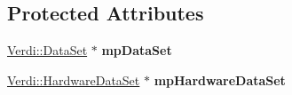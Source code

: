 \subsection*{\-Protected \-Attributes}
\begin{DoxyCompactItemize}
\item 
\hypertarget{class_data_set_variable_ac56dd5a4e81bebd16afad09d38a99009}{\hyperlink{class_verdi_1_1_data_set}{\-Verdi\-::\-Data\-Set} $\ast$ {\bfseries mp\-Data\-Set}}\label{class_data_set_variable_ac56dd5a4e81bebd16afad09d38a99009}

\item 
\hypertarget{class_data_set_variable_acfbb9e17f9547296cbf2cebd41813cb3}{\hyperlink{class_verdi_1_1_hardware_data_set}{\-Verdi\-::\-Hardware\-Data\-Set} $\ast$ {\bfseries mp\-Hardware\-Data\-Set}}\label{class_data_set_variable_acfbb9e17f9547296cbf2cebd41813cb3}

\end{DoxyCompactItemize}


